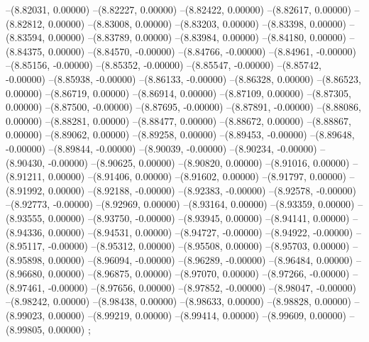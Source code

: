 --(8.82031, 0.00000)
--(8.82227, 0.00000)
--(8.82422, 0.00000)
--(8.82617, 0.00000)
--(8.82812, 0.00000)
--(8.83008, 0.00000)
--(8.83203, 0.00000)
--(8.83398, 0.00000)
--(8.83594, 0.00000)
--(8.83789, 0.00000)
--(8.83984, 0.00000)
--(8.84180, 0.00000)
--(8.84375, 0.00000)
--(8.84570, -0.00000)
--(8.84766, -0.00000)
--(8.84961, -0.00000)
--(8.85156, -0.00000)
--(8.85352, -0.00000)
--(8.85547, -0.00000)
--(8.85742, -0.00000)
--(8.85938, -0.00000)
--(8.86133, -0.00000)
--(8.86328, 0.00000)
--(8.86523, 0.00000)
--(8.86719, 0.00000)
--(8.86914, 0.00000)
--(8.87109, 0.00000)
--(8.87305, 0.00000)
--(8.87500, -0.00000)
--(8.87695, -0.00000)
--(8.87891, -0.00000)
--(8.88086, 0.00000)
--(8.88281, 0.00000)
--(8.88477, 0.00000)
--(8.88672, 0.00000)
--(8.88867, 0.00000)
--(8.89062, 0.00000)
--(8.89258, 0.00000)
--(8.89453, -0.00000)
--(8.89648, -0.00000)
--(8.89844, -0.00000)
--(8.90039, -0.00000)
--(8.90234, -0.00000)
--(8.90430, -0.00000)
--(8.90625, 0.00000)
--(8.90820, 0.00000)
--(8.91016, 0.00000)
--(8.91211, 0.00000)
--(8.91406, 0.00000)
--(8.91602, 0.00000)
--(8.91797, 0.00000)
--(8.91992, 0.00000)
--(8.92188, -0.00000)
--(8.92383, -0.00000)
--(8.92578, -0.00000)
--(8.92773, -0.00000)
--(8.92969, 0.00000)
--(8.93164, 0.00000)
--(8.93359, 0.00000)
--(8.93555, 0.00000)
--(8.93750, -0.00000)
--(8.93945, 0.00000)
--(8.94141, 0.00000)
--(8.94336, 0.00000)
--(8.94531, 0.00000)
--(8.94727, -0.00000)
--(8.94922, -0.00000)
--(8.95117, -0.00000)
--(8.95312, 0.00000)
--(8.95508, 0.00000)
--(8.95703, 0.00000)
--(8.95898, 0.00000)
--(8.96094, -0.00000)
--(8.96289, -0.00000)
--(8.96484, 0.00000)
--(8.96680, 0.00000)
--(8.96875, 0.00000)
--(8.97070, 0.00000)
--(8.97266, -0.00000)
--(8.97461, -0.00000)
--(8.97656, 0.00000)
--(8.97852, -0.00000)
--(8.98047, -0.00000)
--(8.98242, 0.00000)
--(8.98438, 0.00000)
--(8.98633, 0.00000)
--(8.98828, 0.00000)
--(8.99023, 0.00000)
--(8.99219, 0.00000)
--(8.99414, 0.00000)
--(8.99609, 0.00000)
--(8.99805, 0.00000)
;
